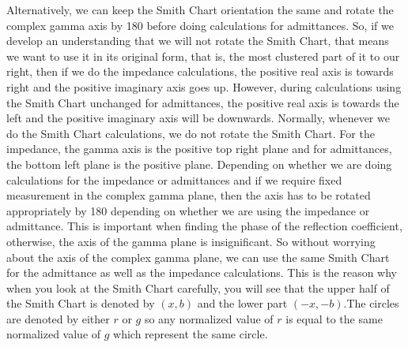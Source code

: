 Alternatively, we can keep the Smith Chart orientation the same and rotate the complex gamma axis by 180\textdegree\; before doing calculations for admittances. So, if we develop an understanding that we will not rotate the Smith Chart, that means we want to use it in its original form, that is, the most clustered part of it to our right, then if we do the impedance calculations, the positive real axis is towards right and the positive imaginary axis goes up. However, during calculations using the Smith Chart unchanged for admittances, the positive real axis is towards the left and the  positive imaginary axis will be downwards. Normally, whenever we do the Smith Chart calculations, we do not rotate the Smith Chart. For the impedance, the gamma axis is the  positive top right plane and for admittances, the bottom left plane is the positive plane. Depending on whether we are doing calculations for the impedance or admittances and if we require fixed measurement in the complex gamma plane, then the axis has to be rotated appropriately by 180\textdegree\; depending on whether we are using the impedance or admittance. This is important when finding the phase of the reflection coefficient, otherwise, the axis of the gamma plane is insignificant. So without worrying about the axis of the complex gamma plane, we can use the same Smith Chart for the admittance as well as the impedance calculations. This is the reason why when you look at the Smith Chart carefully, you will see that the upper half of the Smith Chart is denoted by $(x,b)$ and the lower part $(-x,-b)$.The circles are denoted by either $r$ or $g$ so any normalized value of $r$ is equal to the same normalized value of $g$ which represent the same circle. 

